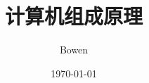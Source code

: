 \documentclass[a4paper,12pt]{article}
\begin{document}
    \title{计算机组成原理}
    \author{Bowen}
    \date{\today}
    \maketitle
    \renewcommand{\contentsname}{}
    \tableofcontents
    \newpage

    

    

    

    

    
\end{document}

